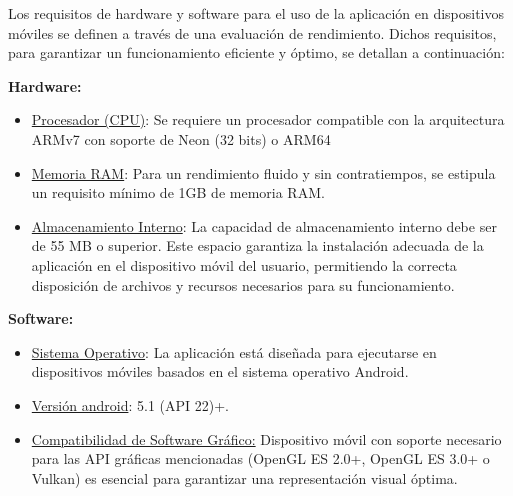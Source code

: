 Los requisitos de hardware y software para el uso de la aplicación en dispositivos móviles se definen a través de una evaluación de rendimiento. Dichos requisitos, para garantizar un funcionamiento eficiente y óptimo, se detallan a continuación:

\textbf{Hardware:}
\begin{itemize}
    \item \underline{Procesador (CPU)}: Se requiere un procesador compatible con la arquitectura ARMv7 con soporte de Neon (32 bits) o ARM64
    \item  \underline{Memoria RAM}: Para un rendimiento fluido y sin contratiempos, se estipula un requisito mínimo de 1GB de memoria RAM.  
    \item \underline{Almacenamiento Interno}: La capacidad de almacenamiento interno debe ser de 55 MB o superior. Este espacio garantiza la instalación adecuada de la aplicación en el dispositivo móvil del usuario, permitiendo la correcta disposición de archivos y recursos necesarios para su funcionamiento.   
\end{itemize}

\textbf{Software:}
\begin{itemize}
    \item \underline{Sistema Operativo}: La aplicación está diseñada para ejecutarse en dispositivos móviles basados en el sistema operativo Android.
    \item \underline{Versión android}: 5.1 (API 22)+.
    \item \underline{Compatibilidad de Software Gráfico:} Dispositivo móvil con soporte necesario para las API gráficas mencionadas (OpenGL ES 2.0+, OpenGL ES 3.0+ o Vulkan) es esencial para garantizar una representación visual óptima. 
\end{itemize} 